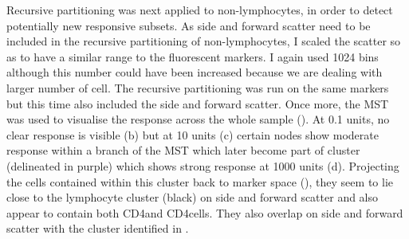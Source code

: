 Recursive partitioning was next applied to non-lymphocytes, in order to detect potentially new responsive subsets.
As side and forward scatter need to be included in the recursive partitioning of non-lymphocytes,
I scaled the scatter so as to have a similar range to the fluorescent markers.
I again used 1024 bins although this number could have been increased because we are dealing with larger number of cell.
The recursive partitioning was run on the same markers but this time also included the side and forward scatter.
Once more, the MST was used to visualise the response across the whole sample ().
At 0.1 units, no clear response is visible (b) but at 10 units
(c) certain nodes show moderate response within a branch of the MST which
later become part of cluster (delineated in purple) which shows strong response at 1000 units (d).
Projecting the cells contained within this cluster back to marker space (), 
they seem to lie close to the lymphocyte cluster (black) on side and forward scatter and also appear to contain both CD4\negative and CD4\positive cells.
They also overlap on side and forward scatter with the cluster identified in .

